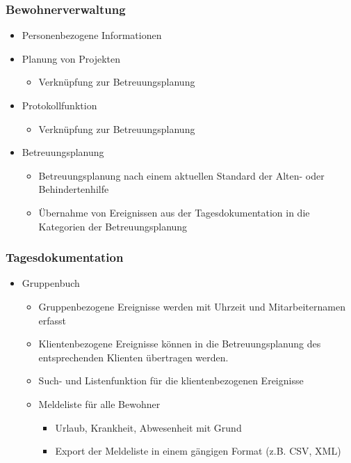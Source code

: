 \documentclass[a4paper,10pt]{article}
\begin{document}
\subsubsection{Bewohnerverwaltung}
\begin{itemize}
	\item Personenbezogene Informationen
	\item Planung von Projekten
	\begin{itemize}
		\item Verknüpfung zur Betreuungsplanung
	\end{itemize}
	\item Protokollfunktion
	\begin{itemize}
		\item Verknüpfung zur Betreuungsplanung
	\end{itemize}
	\item  Betreuungsplanung
	\begin{itemize}
		\item Betreuungsplanung nach einem aktuellen Standard der Alten- oder Behindertenhilfe
		\item Übernahme von Ereignissen aus der Tagesdokumentation in die Kategorien der Betreuungsplanung
	\end{itemize}
\end{itemize}
\subsubsection{Tagesdokumentation}
\begin{itemize}
	\item Gruppenbuch
	\begin{itemize}
		\item Gruppenbezogene Ereignisse werden mit Uhrzeit und Mitarbeiternamen erfasst
		\item Klientenbezogene Ereignisse können in die Betreuungsplanung des entsprechenden Klienten übertragen werden.
		\item Such- und Listenfunktion für die klientenbezogenen Ereignisse
		\item Meldeliste für alle Bewohner
		\begin{itemize}
			\item Urlaub, Krankheit, Abwesenheit mit Grund
			\item Export der Meldeliste in einem gängigen Format (z.B. CSV, XML)
		\end{itemize}
	\end{itemize}
\end{itemize}
\end{document}
